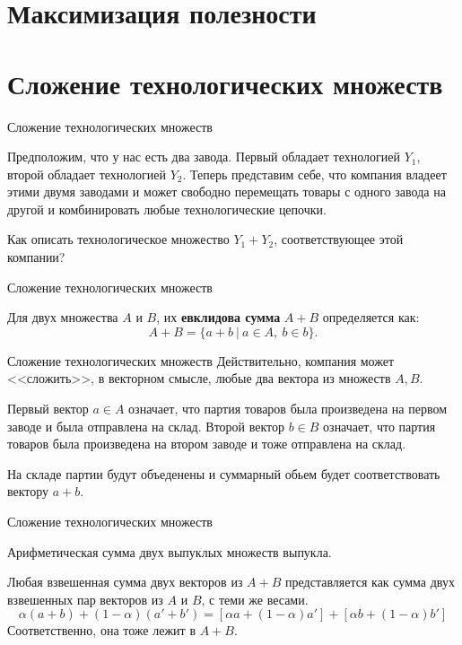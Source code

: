 \documentclass{beamer}
\begin{document}
\section{Максимизация полезности}

\section{Сложение технологических множеств}

\begin{frame}{Сложение технологических множеств}

Предположим, что у нас есть два завода. Первый обладает технологией $Y_1$, второй обладает технологией $Y_2$. Теперь представим себе, что компания владеет этими двумя заводами и может свободно перемещать товары с одного завода на другой и комбинировать любые технологические цепочки. 

Как описать технологическое множество $Y_1 + Y_2$, соответствующее этой компании?

\end{frame}

\begin{frame}{Сложение технологических множеств}

\begin{definition}
Для двух множества $A$ и $B$, их \textbf{евклидова сумма} $A+B$ определяется как:
$$ A+B = \{a + b \ | \ a \in A, \ b \in b\}.$$
\end{definition}
\end{frame}

\begin{frame}{Сложение технологических множеств}
Действительно, компания может <<сложить>>, в векторном смысле, любые два вектора из множеств $A, B$. 

Первый вектор $a \in A$ означает, что партия товаров была произведена на первом заводе и была отправлена на склад. Второй вектор $b \in B$ означает, что партия товаров была произведена на втором заводе и тоже отправлена на склад. 

На складе партии будут объеденены и суммарный обьем будет соответствовать вектору $a + b$.
\end{frame}

\begin{frame}{Сложение технологических множеств}
\begin{lemma}
Арифметическая сумма двух выпуклых множеств выпукла.
\end{lemma}
Любая взвешенная сумма двух векторов из $A+B$ представляется как сумма двух взвешенных пар векторов из $A$ и $B$, с теми же весами.
$$ \alpha(a + b) + (1-\alpha)(a'+b') = [\alpha a + (1-\alpha) a'] + [\alpha b + (1-\alpha) b']$$
Соответственно, она тоже лежит в $A + B$.
\end{frame}
\end{document}
